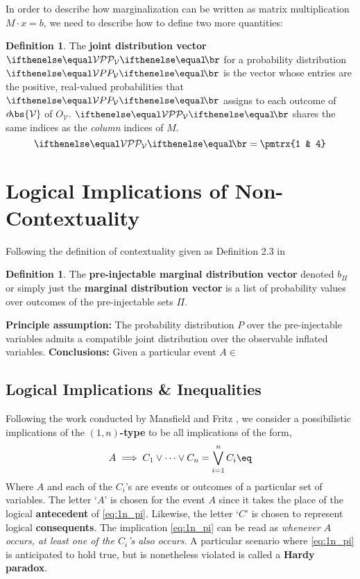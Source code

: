 \documentclass[aps, 10pt, english, twoside, pra, longbibliography]{revtex4-1}
\theoremstyle{plain}
\theoremstyle{definition}
\newtheorem{definition}[theorem]{Definition}
\theoremstyle{remark}
\newcommand{\term}[1]{\textcolor{Mahogany}{\textbf{#1}}}
\newcommand{\outc}[1]{o\!\bs{#1}}
\begin{document}
    In order to describe how marginalization can be written as matrix multiplication $M \cdot x = b$, we need to describe how to define two more quantities:

    \begin{definition}
        The \term{joint distribution vector} $\probvec[\mathcal{V}]$ for a probability distribution $\prob[\mathcal{V}]$ is the vector whose entries are the positive, real-valued probabilities that $\prob[\mathcal{V}]$ assigns to each outcome of $\outc{\mathcal{V}}$ of $O_\mathcal{V}$. $\probvec[\mathcal{V}]$ shares the same indices as the \textit{column} indices of $M$.
        \[ \probvec[\mathcal{V}] = \pmtrx{1 & 4} \]
    \end{definition}



    \section{Logical Implications of Non-Contextuality}
    Following the definition of contextuality given as Definition 2.3 in \cite{Fritz_2011}
    \begin{definition}
        The \term{pre-injectable marginal distribution vector} denoted $b_\Pi$ or simply just the \term{marginal distribution vector} is a list of probability values over outcomes of the pre-injectable sets $\Pi$.
    \end{definition}

    \textbf{Principle assumption:} The probability distribution $P$ over the pre-injectable variables admits a compatible joint distribution over the observable inflated variables.
    \textbf{Conclusions:} Given a particular event $A \in $
    \subsection{Logical Implications \& Inequalities}
    Following the work conducted by Mansfield and Fritz \cite{Mansfield_2012}, we consider a possibilistic implications of the \term{$(1,n)$-type} to be all implications of the form,
    \[ A \implies C_1 \lor \cdots \lor C_n = \bigvee_{i=1}^{n} C_i \eq \label{eq:1n_pi}\]
    Where $A$ and each of the $C_i$'s are events or outcomes of a particular set of variables. The letter `$A$' is chosen for the event $A$ since it takes the place of the logical \term{antecedent} of \cref{eq:1n_pi}. Likewise, the letter `$C$' is chosen to represent logical \term{consequents}. The implication \cref{eq:1n_pi} can be read as \textit{whenever $A$ occurs, at least one of the $C_i$'s also occurs}. A particular scenario where \cref{eq:1n_pi} is anticipated to hold true, but is nonetheless violated is called a \term{Hardy paradox}.
\end{document}
